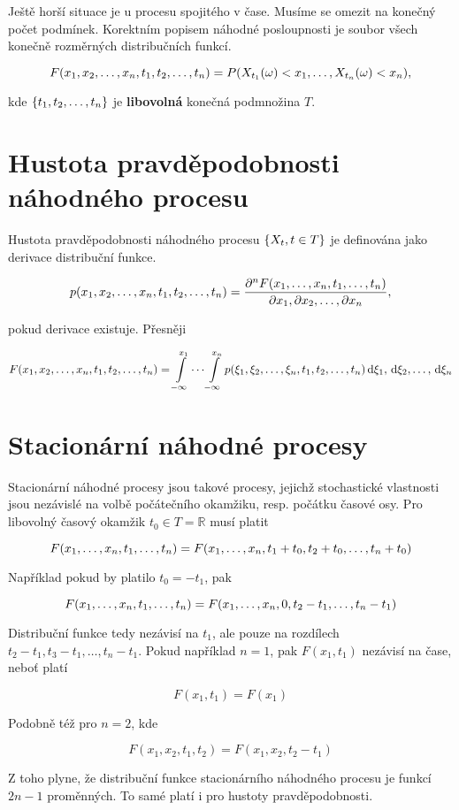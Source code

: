 Ještě horší situace je u procesu spojitého v čase. Musíme se omezit na konečný počet podmínek. Korektním popisem náhodné posloupnosti je soubor všech konečně rozměrných distribučních funkcí.

\[ F(\vecrow[x],\vecrow[t])=P(X_{t_1}(\omega)<x_1,\ldots, X_{t_n}(\omega)<x_n), \]

kde $\brs{\vecrow[t]}$ je \textbf{libovolná} konečná podmnožina $T$.

\section{Hustota pravděpodobnosti náhodného procesu}
Hustota pravděpodobnosti náhodného procesu $\brs{X_t,t\in T}$ je definována jako derivace distribuční funkce.

\[ p(\vecrow[x],\vecrow[t])=\frac{\partial^n F(\svecrow[x],\svecrow[t])}{\vecrow[\partial x]}, \]

pokud derivace existuje. Přesněji

\[ F(\vecrow[x],\vecrow[t])=\int\limits_{-\infty}^{x_1}\cdots\int\limits_{-\infty}^{x_n}p(\vecrow[\xi],\vecrow[t])\vecrow[\d\xi] \]

\section{Stacionární náhodné procesy}
Stacionární náhodné procesy jsou takové procesy, jejichž stochastické vlastnosti jsou nezávislé na volbě počátečního okamžiku, resp. počátku časové osy. Pro libovolný časový okamžik $t_0\in T=\mathbb{R}$ musí platit

\[ F(\svecrow[x],\svecrow[t])=F(\svecrow[x],t_1+t_0,t_2+t_0,\ldots,t_n+t_0) \]

Například pokud by platilo $t_0=-t_1$, pak

\[ F(\svecrow[x],\svecrow[t])=F(\svecrow[x],0,t_2-t_1,\ldots,t_n-t_1) \]

Distribuční funkce tedy nezávisí na $t_1$, ale pouze na rozdílech $t_2-t_1,t_3-t_1,\ldots,t_n-t_1$. Pokud například $n=1$, pak $F(x_1,t_1)$ nezávisí na čase, neboť platí

\[ F(x_1,t_1)=F(x_1) \]

Podobně též pro $n=2$, kde

\[ F(x_1,x_2,t_1,t_2)=F(x_1,x_2,t_2-t_1) \]

Z toho plyne, že distribuční funkce stacionárního náhodného procesu je funkcí $2n-1$ proměnných. To samé platí i pro hustoty pravděpodobnosti.

